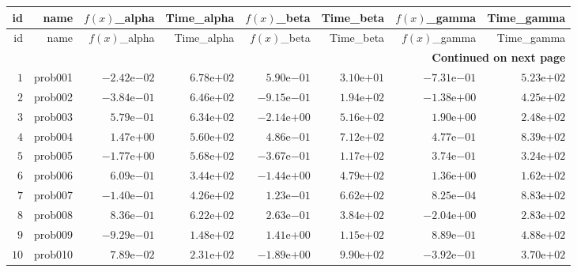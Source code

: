 \documentclass[varwidth=20cm,crop=true]{standalone}
\begin{document}
\begin{longtable}{rrrrrrrr}
  \hline
  id & name & \(f(x)\)\_alpha & Time\_alpha & \(f(x)\)\_beta & Time\_beta & \(f(x)\)\_gamma & Time\_gamma \\\hline
  \endfirsthead
  \hline
  id & name & \(f(x)\)\_alpha & Time\_alpha & \(f(x)\)\_beta & Time\_beta & \(f(x)\)\_gamma & Time\_gamma \\\hline
  \endhead
  \hline
  \multicolumn{8}{r}{{\bfseries Continued on next page}}\\
  \hline
  \endfoot
  \endlastfoot
  \(     1\) & prob001 & \(-2.42\)e\(-02\) & \( 6.78\)e\(+02\) & \( 5.90\)e\(-01\) & \( 3.10\)e\(+01\) & \(-7.31\)e\(-01\) & \( 5.23\)e\(+02\) \\
  \(     2\) & prob002 & \(-3.84\)e\(-01\) & \( 6.46\)e\(+02\) & \(-9.15\)e\(-01\) & \( 1.94\)e\(+02\) & \(-1.38\)e\(+00\) & \( 4.25\)e\(+02\) \\
  \(     3\) & prob003 & \( 5.79\)e\(-01\) & \( 6.34\)e\(+02\) & \(-2.14\)e\(+00\) & \( 5.16\)e\(+02\) & \( 1.90\)e\(+00\) & \( 2.48\)e\(+02\) \\
  \(     4\) & prob004 & \( 1.47\)e\(+00\) & \( 5.60\)e\(+02\) & \( 4.86\)e\(-01\) & \( 7.12\)e\(+02\) & \( 4.77\)e\(-01\) & \( 8.39\)e\(+02\) \\
  \(     5\) & prob005 & \(-1.77\)e\(+00\) & \( 5.68\)e\(+02\) & \(-3.67\)e\(-01\) & \( 1.17\)e\(+02\) & \( 3.74\)e\(-01\) & \( 3.24\)e\(+02\) \\
  \(     6\) & prob006 & \( 6.09\)e\(-01\) & \( 3.44\)e\(+02\) & \(-1.44\)e\(+00\) & \( 4.79\)e\(+02\) & \( 1.36\)e\(+00\) & \( 1.62\)e\(+02\) \\
  \(     7\) & prob007 & \(-1.40\)e\(-01\) & \( 4.26\)e\(+02\) & \( 1.23\)e\(-01\) & \( 6.62\)e\(+02\) & \( 8.25\)e\(-04\) & \( 8.83\)e\(+02\) \\
  \(     8\) & prob008 & \( 8.36\)e\(-01\) & \( 6.22\)e\(+02\) & \( 2.63\)e\(-01\) & \( 3.84\)e\(+02\) & \(-2.04\)e\(+00\) & \( 2.83\)e\(+02\) \\
  \(     9\) & prob009 & \(-9.29\)e\(-01\) & \( 1.48\)e\(+02\) & \( 1.41\)e\(+00\) & \( 1.15\)e\(+02\) & \( 8.89\)e\(-01\) & \( 4.88\)e\(+02\) \\
  \(    10\) & prob010 & \( 7.89\)e\(-02\) & \( 2.31\)e\(+02\) & \(-1.89\)e\(+00\) & \( 9.90\)e\(+02\) & \(-3.92\)e\(-01\) & \( 3.70\)e\(+02\) \\\hline
\end{longtable}
\end{document}
